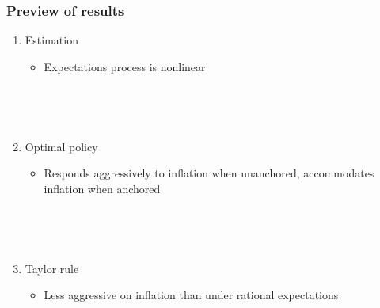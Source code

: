 \documentclass[10pt]{beamer}
\begin{document}
\begin{frame}
	\frametitle{Preview of results}
	
	\vspace{0.5cm}
	\begin{enumerate}
	\item Estimation
		\begin{itemize}
		\item Expectations process is nonlinear
		
		\
		
		
		\end{itemize}
		
		\
		
	\item Optimal policy
		\begin{itemize}
		\item Responds aggressively to inflation when unanchored, accommodates inflation when anchored
		\end{itemize}
		
		\
		
		\
		
	\item Taylor rule
		\begin{itemize}
		\item Less aggressive on inflation than under rational expectations
		\end{itemize}
	\end{enumerate}

	

\end{frame}
\end{document}
